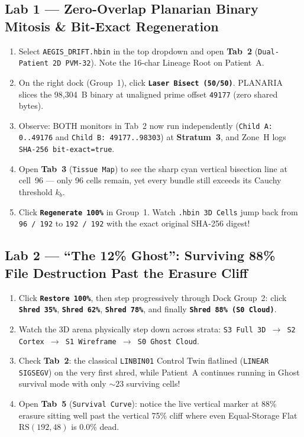 \documentclass[10pt,letterpaper]{article}
\begin{document}
\subsection{Lab 1 --- Zero-Overlap Planarian Binary Mitosis \& Bit-Exact Regeneration}
\begin{enumerate}[leftmargin=1.6em, itemsep=1.5pt]
  \item Select \texttt{AEGIS\_DRIFT.hbin} in the top dropdown and open \textbf{Tab~2} (\texttt{Dual-Patient 2D PVM-32}). Note the 16-char Lineage Root on Patient~A.
  \item On the right dock (Group~1), click \textbf{\texttt{Laser Bisect (50/50)}}. PLANARIA slices the 98,304~B binary at unaligned prime offset \texttt{49177} (zero shared bytes).
  \item Observe: BOTH monitors in Tab~2 now run independently (\texttt{Child A: 0..49176} and \texttt{Child B: 49177..98303}) at \textbf{Stratum~3}, and Zone~H logs \texttt{SHA-256 bit-exact=true}.
  \item Open \textbf{Tab~3} (\texttt{Tissue Map}) to see the sharp cyan vertical bisection line at cell~96 --- only 96 cells remain, yet every bundle still exceeds its Cauchy threshold $k_b$.
  \item Click \textbf{\texttt{Regenerate 100\%}} in Group~1. Watch \texttt{.hbin 3D Cells} jump back from \texttt{96 / 192} to \texttt{192 / 192} with the exact original SHA-256 digest!
\end{enumerate}

\subsection{Lab 2 --- ``The 12\% Ghost'': Surviving 88\% File Destruction Past the Erasure Cliff}
\begin{enumerate}[leftmargin=1.6em, itemsep=1.5pt]
  \item Click \textbf{\texttt{Restore 100\%}}, then step progressively through Dock Group~2: click \textbf{\texttt{Shred 35\%}}, \textbf{\texttt{Shred 62\%}}, \textbf{\texttt{Shred 78\%}}, and finally \textbf{\texttt{Shred 88\% (S0 Cloud)}}.
  \item Watch the 3D arena physically step down across strata: \texttt{S3 Full 3D $\to$ S2 Cortex $\to$ S1 Wireframe $\to$ S0 Ghost Cloud}.
  \item Check \textbf{Tab~2}: the classical \texttt{LINBIN01} Control Twin flatlined (\texttt{LINEAR SIGSEGV}) on the very first shred, while Patient~A continues running in Ghost survival mode with only $\sim 23$ surviving cells!
  \item Open \textbf{Tab~5} (\texttt{Survival Curve}): notice the live vertical marker at 88\% erasure sitting well past the vertical 75\% cliff where even Equal-Storage Flat $\mathrm{RS}(192,48)$ is 0.0\% dead.
\end{enumerate}
\end{document}
